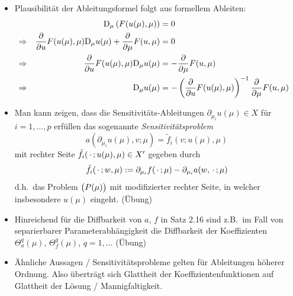 \begin{bem} \beginwithlistbem
	\begin{itemize}
		\item Plausibilität der Ableitungsformel folgt aus formellem Ableiten:
			\begin{align*}
				&&\mathrm{D}_\mu \left(F(u(\mu),\mu)\right) &= 0 &\\
				&\Rightarrow& \frac{\partial}{\partial {u}} F(u(\mu),\mu) \mathrm{D}_\mu u(\mu) + \frac{\partial}{\partial {\mu}} F(u,\mu) &= 0 &\\
				&\Rightarrow& \frac{\partial}{\partial {u}} F(u(\mu),\mu) \mathrm{D}_\mu u(\mu) &= -\frac{\partial}{\partial {\mu}} F(u,\mu) &\\
				&\Rightarrow& \mathrm{D}_\mu u(\mu) &= -\left(\frac{\partial}{\partial {u}} F(u(\mu),\mu) \right)^{-1} \frac{\partial}{\partial {\mu}} F(u,\mu) &
			\end{align*}
		\item Man kann zeigen, dass die Sensitivitäts-Ableitungen $\partial_{\mu_i} u(\mu) \in X$ für $i = 1,\dots,p$ erfüllen das sogenannte \emph{Sensitivitätsproblem}
			\[
				a(\partial_{\mu_i} u(\mu),v;\mu) = \tilde f_i(v;u(\mu),\mu)
			\]
			mit rechter Seite $\tilde f_i(\,\cdot\,; u(\mu),\mu) \in X'$ gegeben durch
			\[
				\tilde f_i(\,\cdot\,;w,\mu) := \partial_{\mu_i} f(\,\cdot\,;\mu) - \partial_{\mu_i} a(w,\,\cdot\,;\mu)
			\]
			d.h.\ das Problem $\big(P(\mu)\big)$ mit modifizierter rechter Seite, in welcher insbesondere $u(\mu)$ eingeht. (Übung)
		\item Hinreichend für die Diffbarkeit von $a$, $f$ in Satz 2.16 sind z.B.\ im Fall von separierbarer Parameterabhängigkeit die Diffbarkeit der Koeffizienten $\Theta_a^q(\mu)$, $\Theta_f^q(\mu)$, $q = 1,\dots$ (Übung)
		\item Ähnliche Aussagen / Sensitivitätsprobleme gelten für Ableitungen höherer Ordnung.
			Also überträgt sich Glattheit der Koeffizientenfunktionen auf Glattheit der Lösung / Mannigfaltigkeit.
	\end{itemize}
\end{bem}
